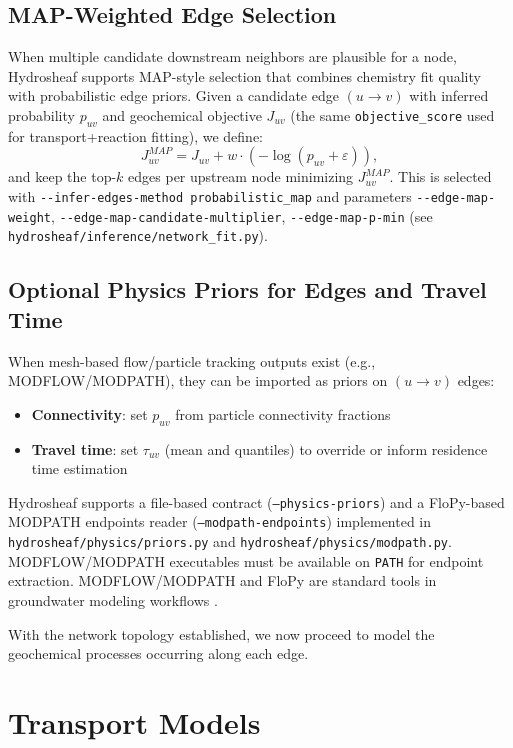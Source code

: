\documentclass[12pt,a4paper]{article}
\theoremstyle{plain}
\theoremstyle{definition}
\theoremstyle{remark}
\begin{document}
\subsection{MAP-Weighted Edge Selection}

When multiple candidate downstream neighbors are plausible for a node, Hydrosheaf supports MAP-style selection that combines chemistry fit quality with probabilistic edge priors. Given a candidate edge $(u\to v)$ with inferred probability $p_{uv}$ and geochemical objective $J_{uv}$ (the same \texttt{objective\_score} used for transport+reaction fitting), we define:
\begin{equation}
	J^{MAP}_{uv} = J_{uv} + w \cdot \left(-\log(p_{uv} + \varepsilon)\right),
\end{equation}
and keep the top-$k$ edges per upstream node minimizing $J^{MAP}_{uv}$. This is selected with \nolinkurl{--infer-edges-method probabilistic_map} and parameters \nolinkurl{--edge-map-weight}, \nolinkurl{--edge-map-candidate-multiplier}, \nolinkurl{--edge-map-p-min} (see \nolinkurl{hydrosheaf/inference/network_fit.py}).

\subsection{Optional Physics Priors for Edges and Travel Time}

When mesh-based flow/particle tracking outputs exist (e.g., MODFLOW/MODPATH), they can be imported as priors on $(u\to v)$ edges:
\begin{itemize}
	\item \textbf{Connectivity}: set $p_{uv}$ from particle connectivity fractions
	\item \textbf{Travel time}: set $\tau_{uv}$ (mean and quantiles) to override or inform residence time estimation
\end{itemize}
Hydrosheaf supports a file-based contract (\texttt{--physics-priors}) and a FloPy-based MODPATH endpoints reader (\texttt{--modpath-endpoints}) implemented in \texttt{hydrosheaf/physics/priors.py} and \texttt{hydrosheaf/physics/modpath.py}. MODFLOW/MODPATH executables must be available on \texttt{PATH} for endpoint extraction. MODFLOW/MODPATH and FloPy are standard tools in groundwater modeling workflows \cite{harbaugh2005, pollock2016, bakker2016}.


With the network topology established, we now proceed to model the geochemical processes occurring along each edge.
\newpage
\section{Transport Models}\label{sec:transport}
\end{document}
